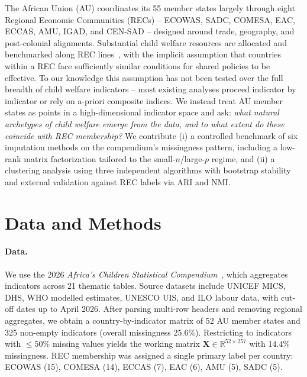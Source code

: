 \documentclass[runningheads]{llncs}
\begin{document}
The African Union (AU) coordinates its 55 member states largely through eight Regional Economic Communities (RECs) -- ECOWAS, SADC, COMESA, EAC, ECCAS, AMU, IGAD, and CEN-SAD -- designed around trade, geography, and post-colonial alignments. Substantial child welfare resources are allocated and benchmarked along REC lines~\cite{ref_unicef_compendium,ref_au_recs}, with the implicit assumption that countries within a REC face sufficiently similar conditions for shared policies to be effective. To our knowledge this assumption has not been tested over the full breadth of child welfare indicators -- most existing analyses proceed indicator by indicator or rely on a-priori composite indices. We instead treat AU member states as points in a high-dimensional indicator space and ask: \emph{what natural archetypes of child welfare emerge from the data, and to what extent do these coincide with REC membership?} We contribute (i) a controlled benchmark of six imputation methods on the compendium's missingness pattern, including a low-rank matrix factorization tailored to the small-$n$/large-$p$ regime, and (ii) a clustering analysis using three independent algorithms with bootstrap stability and external validation against REC labels via ARI and NMI.

\section{Data and Methods}\label{sec:methods}

\paragraph{Data.} We use the 2026 \emph{Africa's Children Statistical Compendium}~\cite{ref_unicef_compendium}, which aggregates indicators across 21 thematic tables. Source datasets include UNICEF MICS, DHS, WHO modelled estimates, UNESCO UIS, and ILO labour data, with cut-off dates up to April 2026. After parsing multi-row headers and removing regional aggregates, we obtain a country-by-indicator matrix of 52 AU member states and 325 non-empty indicators (overall missingness 25.6\%). Restricting to indicators with $\leq 50\%$ missing values yields the working matrix $\mathbf{X} \in \mathbb{R}^{52 \times 257}$ with 14.4\% missingness. REC membership was assigned a single primary label per country: ECOWAS (15), COMESA (14), ECCAS (7), EAC (6), AMU (5), SADC (5).
\end{document}
